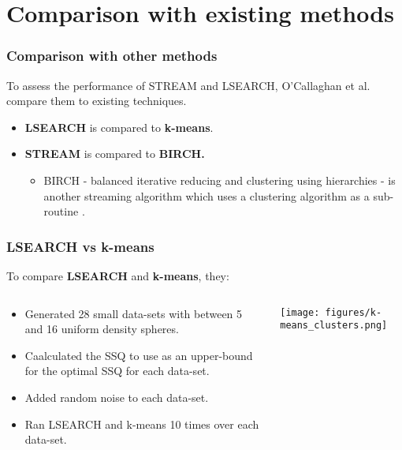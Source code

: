 \documentclass{beamer}
\begin{document}
\section{Comparison with existing methods}
\frame
{
  \frametitle{Comparison with other methods}
  To assess the performance of STREAM and LSEARCH, O'Callaghan et al. compare them to existing techniques.
  
  \bigskip 
  \begin{itemize}
  \item{\textbf{LSEARCH} is compared to \textbf{k-means}.}
  
  \bigskip
  \item{\textbf{STREAM} is compared to \textbf{BIRCH.}
    \begin{itemize}
      \item{BIRCH - balanced iterative reducing and clustering using hierarchies - is another streaming algorithm which uses a clustering algorithm as a sub-routine \cite{1996birch}.}
    \end{itemize}
  }
  	     
  \end{itemize}
}

\frame
{
  \frametitle{LSEARCH vs k-means}
  
  To compare \textbf{LSEARCH} and \textbf{k-means}, they:
  
  \begin{columns}
  
    \begin{column}{0.5\textwidth}
       \begin{itemize}
          \item{Generated 28 small data-sets with between 5 and 16 uniform density spheres.}
          \item{Caalculated the SSQ to use as an upper-bound for the optimal SSQ for each data-set.}
          \item{Added random noise to each data-set.}
          \item{Ran LSEARCH and k-means 10 times over each data-set.}
      \end{itemize}
    \end{column}
    
    \begin{column}{0.5\textwidth}
        \begin{center}
         \texttt{[image: figures/k-means\_clusters.png]}      
        \end{center}
    \end{column}
    
  \end{columns}  
}
\end{document}
